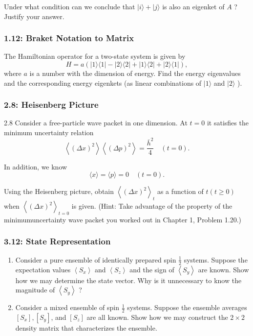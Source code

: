\documentclass[11pt]{article}
\begin{document}
Under what condition can we conclude that \(|i\rangle+|j\rangle\) is also an
eigenket of \(A\) ? Justify your answer.
\subsubsection{1.12: Braket Notation to Matrix}
\label{sec:org02d45b2}
The Hamiltonian operator for a two-state system is given by $$
H=a(|1\rangle\langle 1|-| 2\rangle\langle 2|+| 1\rangle\langle 2|+|
2\rangle\langle 1|), $$ where \(a\) is a number with the dimension of energy. Find
the energy eigenvalues and the corresponding energy eigenkets (as linear
combinations of \(|1\rangle\) and \(|2\rangle\) ).
\subsubsection{2.8: Heisenberg Picture}
\label{sec:org8a46d5c}
2.8 Consider a free-particle wave packet in one dimension. At \(t=0\) it satisfies the minimum uncertainty relation
$$
\left\langle(\Delta x)^2\right\rangle\left\langle(\Delta p)^2\right\rangle=\frac{\bar{h}^2}{4} \quad(t=0) .
$$

In addition, we know
$$
\langle x\rangle=\langle p\rangle=0 \quad(t=0) .
$$

Using the Heisenberg picture, obtain \(\left\langle(\Delta x)^2\right\rangle_t\) as a function of \(t(t \geq 0)\) when \(\left\langle(\Delta x)^2\right\rangle_{t=0}\) is given. (Hint: Take advantage of the property of the minimumuncertainty wave packet you worked out in Chapter 1, Problem 1.20.)
\subsubsection{3.12: State Representation}
\label{sec:org23a77cb}
\begin{enumerate}
\item Consider a pure ensemble of identically prepared spin \(\frac{1}{2}\) systems.
Suppose the expectation values \(\left\langle S_x\right\rangle\) and
\(\left\langle S_z\right\rangle\) and the sign of \(\left\langle
   S_y\right\rangle\) are known. Show how we may determine the state vector. Why
is it unnecessary to know the magnitude of \(\left\langle S_y\right\rangle\) ?

\item Consider a mixed ensemble of spin \(\frac{1}{2}\) systems. Suppose the ensemble
averages \(\left[S_x\right],\left[S_y\right]\), and \(\left[S_z\right]\) are all
known. Show how we may construct the \(2 \times 2\) density matrix that
characterizes the ensemble.
\end{enumerate}
\end{document}
